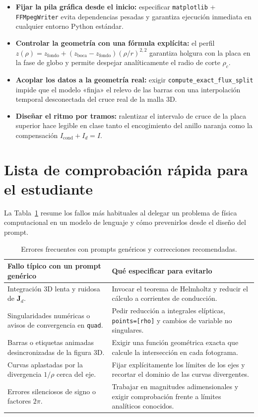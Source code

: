 \documentclass[11pt]{article}
\begin{document}
\begin{itemize}
    \item \textbf{Fijar la pila gráfica desde el inicio:} especificar \texttt{matplotlib} + \texttt{FFMpegWriter} evita dependencias pesadas y garantiza ejecución inmediata en cualquier entorno Python estándar.
    \item \textbf{Controlar la geometría con una fórmula explícita:} el perfil $z(\rho) = z_{\mathrm{fondo}} + (z_{\mathrm{boca}} - z_{\mathrm{fondo}})(\rho/r)^{2{,}2}$ garantiza holgura con la placa en la fase de globo y permite despejar analíticamente el radio de corte $\rho_c$.
    \item \textbf{Acoplar los datos a la geometría real:} exigir \texttt{compute\_exact\_flux\_split} impide que el modelo «finja» el relevo de las barras con una interpolación temporal desconectada del cruce real de la malla 3D.
    \item \textbf{Diseñar el ritmo por tramos:} ralentizar el intervalo de cruce de la placa superior hace legible en clase tanto el encogimiento del anillo naranja como la compensación $I_{\mathrm{cond}} + I_d = I$.
\end{itemize}

\section{Lista de comprobación rápida para el estudiante}

La Tabla~\ref{tab:checklist} resume los fallos más habituales al delegar un problema de física computacional en un modelo de lenguaje y cómo prevenirlos desde el diseño del prompt.

\begin{table}[ht]
\centering
\small
\caption{Errores frecuentes con prompts genéricos y correcciones recomendadas.}
\label{tab:checklist}
\begin{tabular}{@{}p{5.8cm}p{9.2cm}@{}}
\toprule
\textbf{Fallo típico con un prompt genérico} & \textbf{Qué especificar para evitarlo} \\
\midrule
Integración 3D lenta y ruidosa de $\mathbf{J}_d$. & Invocar el teorema de Helmholtz y reducir el cálculo a corrientes de conducción. \\
Singularidades numéricas o avisos de convergencia en \texttt{quad}. & Pedir reducción a integrales elípticas, \texttt{points=[rho]} y cambios de variable no singulares. \\
Barras o etiquetas animadas desincronizadas de la figura 3D. & Exigir una función geométrica exacta que calcule la intersección en cada fotograma. \\
Curvas aplastadas por la divergencia $1/\rho$ cerca del eje. & Fijar explícitamente los límites de los ejes y recortar el dominio de las curvas divergentes. \\
Errores silenciosos de signo o factores $2\pi$. & Trabajar en magnitudes adimensionales y exigir comprobación frente a límites analíticos conocidos. \\
\bottomrule
\end{tabular}
\end{table}
\end{document}

